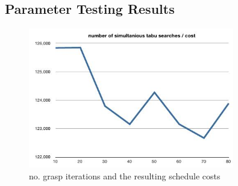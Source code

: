 \documentclass[a4paper,11pt]{article}
\begin{document}
\small



\begin{appendix}
\section{Parameter Testing Results}\label{sec:ptr}

\begin{figure}[htb]
  \begin{center}
    \includegraphics[width=0.8\textwidth]{images/no_grasp_iterations_costs}
  \end{center}
  \caption{no. grasp iterations and the resulting schedule costs}
  \label{fig:tabu_len_cost}
\end{figure}



\end{appendix}
\end{document}
